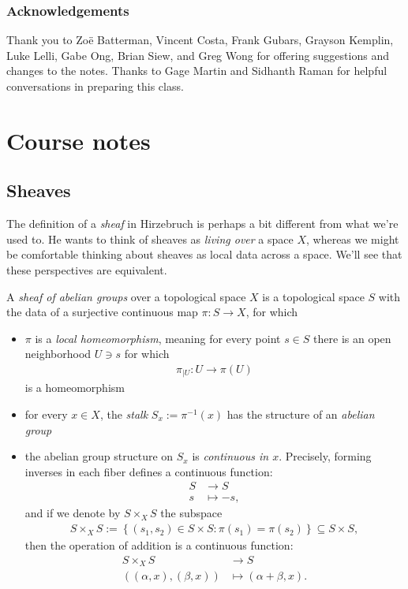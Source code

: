 \documentclass[11pt]{book}
\begin{document}
\subsection{Acknowledgements}

Thank you to Zo\"{e} Batterman, Vincent Costa, Frank Gubars, Grayson Kemplin, Luke Lelli, Gabe Ong, Brian Siew, and Greg Wong for offering suggestions and changes to the notes. Thanks to Gage Martin and Sidhanth Raman for helpful conversations in preparing this class.

\setcounter{tocdepth}{1}
\tableofcontents{}

\chapter{Course notes}
\section{Sheaves}

The definition of a \emph{sheaf} in Hirzebruch is perhaps a bit different from what we're used to. He wants to think of sheaves as \emph{living over} a space $X$, whereas we might be comfortable thinking about sheaves as local data across a space. We'll see that these perspectives are equivalent.

\begin{definition}\label{def:sheaf} 
A \emph{sheaf of abelian groups} over a topological space $X$ is a topological space $S$ with the data of a surjective continuous map $\pi \colon S \to X$, for which
\begin{itemize}
    \item $\pi$ is a \emph{local homeomorphism}, meaning for every point $s\in S$ there is an open neighborhood $U\ni s$ for which
    \begin{align*}
        \pi_{|U} \colon U \to \pi(U)
    \end{align*}
    is a homeomorphism
    \item for every $x\in X$, the \emph{stalk} $S_x := \pi^{-1}(x)$ has the structure of an \emph{abelian group}
    \item the abelian group structure on $S_x$ is \emph{continuous in $x$}. Precisely, forming inverses in each fiber defines a continuous function:
    \begin{align*}
        S &\to S \\
        s &\mapsto -s,
    \end{align*}    
and if we denote by $S \times_X S$ the subspace
    \begin{align*}
        S \times_X S := \left\{ (s_1,s_2) \in S \times S \colon \pi(s_1)=\pi(s_2) \right\} \subseteq S \times S,
    \end{align*}
    then the operation of addition is a continuous function:
    \begin{align*}
        S \times_X S &\to S \\
        \left( (\alpha,x), (\beta,x) \right) &\mapsto (\alpha + \beta,x).
    \end{align*}
\end{itemize}
\end{definition}
\end{document}
